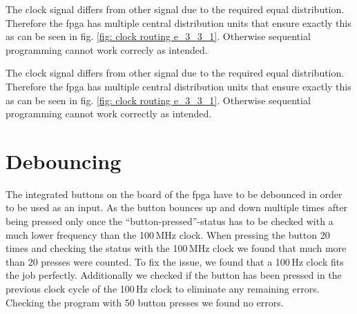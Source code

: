 The clock signal differs from other signal due to the required equal distribution. Therefore the \gls{fpga} has multiple central distribution units that ensure exactly this as can be seen in fig. \ref{fig: clock routing e_3_3_1}. Otherwise sequential programming cannot work correcly as intended.

The clock signal differs from other signal due to the required equal distribution. Therefore the \gls{fpga} has multiple central distribution units that ensure exactly this as can be seen in fig. \ref{fig: clock routing e_3_3_1}. Otherwise sequential programming cannot work correctly as intended.

\section{Debouncing}

The integrated buttons on the board of the \gls{fpga} have to be debounced in order to be used as an input. As the button bounces up and down multiple times after being pressed only once the ``button-pressed''-status has to be checked with a much lower frequency than the 100\,MHz clock. When pressing the button 20 times and checking the status with the 100\,MHz clock we found that much more than 20 presses were counted. To fix the issue, we found that a 100\,Hz clock fits the job perfectly. Additionally we checked if the button has been pressed in the previous clock cycle of the 100\,Hz clock to eliminate any remaining errors. Checking the program with 50 button presses we found no errors.



